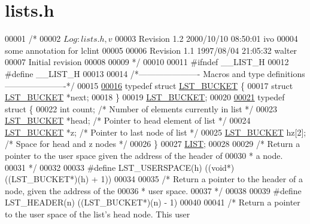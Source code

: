 \hypertarget{lists_8h_source}{}\section{lists.\+h}
\label{lists_8h_source}

\begin{DoxyCode}
00001 \textcolor{comment}{/*}
00002 \textcolor{comment}{  $Log: lists.h,v $}
00003 \textcolor{comment}{  Revision 1.2  2000/10/10 08:50:01  ivo}
00004 \textcolor{comment}{  some annotation for lclint}
00005 \textcolor{comment}{}
00006 \textcolor{comment}{  Revision 1.1  1997/08/04 21:05:32  walter}
00007 \textcolor{comment}{  Initial revision}
00008 \textcolor{comment}{}
00009 \textcolor{comment}{*/}
00010 
00011 \textcolor{preprocessor}{#ifndef \_\_LIST\_H}
00012 \textcolor{preprocessor}{#define \_\_LIST\_H}
00013 
00014 \textcolor{comment}{/*---------------------- Macros and type definitions ----------------------*/}
00015 
\hyperlink{structLST__BUCKET}{00016} \textcolor{keyword}{typedef} \textcolor{keyword}{struct }\hyperlink{structLST__BUCKET}{LST\_BUCKET} \{
00017   \textcolor{keyword}{struct }\hyperlink{structLST__BUCKET}{LST\_BUCKET} *next;
00018 \}
00019 \hyperlink{structLST__BUCKET}{LST\_BUCKET};
00020 
\hyperlink{structLIST}{00021} \textcolor{keyword}{typedef} \textcolor{keyword}{struct }\{
00022   \textcolor{keywordtype}{int} count;      \textcolor{comment}{/* Number of elements currently in list */}
00023   \hyperlink{structLST__BUCKET}{LST\_BUCKET} *head;   \textcolor{comment}{/* Pointer to head element of list      */}
00024   \hyperlink{structLST__BUCKET}{LST\_BUCKET} *z;    \textcolor{comment}{/* Pointer to last node of list         */}
00025   \hyperlink{structLST__BUCKET}{LST\_BUCKET} hz[2];   \textcolor{comment}{/* Space for head and z nodes           */}
00026 \}
00027 \hyperlink{structLIST}{LIST};
00028 
00029 \textcolor{comment}{/* Return a pointer to the user space given the address of the header of}
00030 \textcolor{comment}{ * a node.}
00031 \textcolor{comment}{ */}
00032 
00033 \textcolor{preprocessor}{#define LST\_USERSPACE(h)  ((void*)((LST\_BUCKET*)(h) + 1))}
00034 
00035 \textcolor{comment}{/* Return a pointer to the header of a node, given the address of the}
00036 \textcolor{comment}{ * user space.}
00037 \textcolor{comment}{ */}
00038 
00039 \textcolor{preprocessor}{#define LST\_HEADER(n)   ((LST\_BUCKET*)(n) - 1)}
00040 
00041 \textcolor{comment}{/* Return a pointer to the user space of the list's head node. This user}

\end{DoxyCode}
